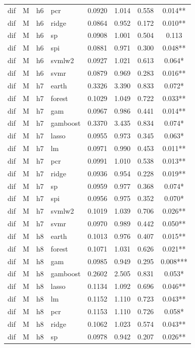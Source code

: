 \begin{ThreePartTable}
\begin{longtable}[t]{llclcccc}
dif & M & h6 & pcr & 0.0920 & 1.014 & 0.558 & 0.014**\\
dif & M & h6 & ridge & 0.0864 & 0.952 & 0.172 & 0.010**\\
dif & M & h6 & sp & 0.0908 & 1.001 & 0.504 & 0.113\\
dif & M & h6 & spi & 0.0881 & 0.971 & 0.300 & 0.048**\\
dif & M & h6 & svmlw2 & 0.0927 & 1.021 & 0.613 & 0.064*\\
dif & M & h6 & svmr & 0.0879 & 0.969 & 0.283 & 0.016**\\
\addlinespace
dif & M & h7 & earth & 0.3326 & 3.390 & 0.833 & 0.072*\\
dif & M & h7 & forest & 0.1029 & 1.049 & 0.722 & 0.033**\\
dif & M & h7 & gam & 0.0967 & 0.986 & 0.441 & 0.014**\\
dif & M & h7 & gamboost & 0.3370 & 3.435 & 0.834 & 0.074*\\
dif & M & h7 & lasso & 0.0955 & 0.973 & 0.345 & 0.063*\\
dif & M & h7 & lm & 0.0971 & 0.990 & 0.453 & 0.011**\\
dif & M & h7 & pcr & 0.0991 & 1.010 & 0.538 & 0.013**\\
dif & M & h7 & ridge & 0.0936 & 0.954 & 0.228 & 0.019**\\
dif & M & h7 & sp & 0.0959 & 0.977 & 0.368 & 0.074*\\
dif & M & h7 & spi & 0.0956 & 0.975 & 0.352 & 0.070*\\
dif & M & h7 & svmlw2 & 0.1019 & 1.039 & 0.706 & 0.026**\\
dif & M & h7 & svmr & 0.0970 & 0.989 & 0.442 & 0.050**\\
\addlinespace
dif & M & h8 & earth & 0.1013 & 0.976 & 0.407 & 0.015**\\
dif & M & h8 & forest & 0.1071 & 1.031 & 0.626 & 0.021**\\
dif & M & h8 & gam & 0.0985 & 0.949 & 0.295 & 0.008***\\
dif & M & h8 & gamboost & 0.2602 & 2.505 & 0.831 & 0.053*\\
dif & M & h8 & lasso & 0.1134 & 1.092 & 0.696 & 0.046**\\
dif & M & h8 & lm & 0.1152 & 1.110 & 0.723 & 0.043**\\
dif & M & h8 & pcr & 0.1153 & 1.110 & 0.726 & 0.058*\\
dif & M & h8 & ridge & 0.1062 & 1.023 & 0.574 & 0.043**\\
dif & M & h8 & sp & 0.0978 & 0.942 & 0.207 & 0.026**\\

\end{longtable}
\end{ThreePartTable}
